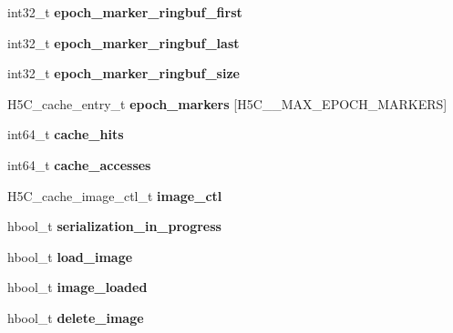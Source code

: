 \begin{DoxyCompactItemize}
int32\+\_\+t {\bfseries epoch\+\_\+marker\+\_\+ringbuf\+\_\+first}
\item 
\mbox{\label{struct_h5_c__t_a704fcc1320e81483343bdeb1ea229a11}} 
int32\+\_\+t {\bfseries epoch\+\_\+marker\+\_\+ringbuf\+\_\+last}
\item 
\mbox{\label{struct_h5_c__t_a3d063fb6a20776a9b2b7812e78e215b8}} 
int32\+\_\+t {\bfseries epoch\+\_\+marker\+\_\+ringbuf\+\_\+size}
\item 
\mbox{\label{struct_h5_c__t_acecfcc8548971c4bf08555a20e411fc6}} 
H5\+C\+\_\+cache\+\_\+entry\+\_\+t {\bfseries epoch\+\_\+markers} \mbox{[}H5\+C\+\_\+\+\_\+\+M\+A\+X\+\_\+\+E\+P\+O\+C\+H\+\_\+\+M\+A\+R\+K\+E\+RS\mbox{]}
\item 
\mbox{\label{struct_h5_c__t_a7377b81b9f84cbbb0692db1addefa52b}} 
int64\+\_\+t {\bfseries cache\+\_\+hits}
\item 
\mbox{\label{struct_h5_c__t_a96c34125092dfb54530c86b448d1de1a}} 
int64\+\_\+t {\bfseries cache\+\_\+accesses}
\item 
\mbox{\label{struct_h5_c__t_a2cac44c9db80702d5f7ded4c929fb769}} 
H5\+C\+\_\+cache\+\_\+image\+\_\+ctl\+\_\+t {\bfseries image\+\_\+ctl}
\item 
\mbox{\label{struct_h5_c__t_acc676110b238bc3ab1377fc3ec0b693d}} 
hbool\+\_\+t {\bfseries serialization\+\_\+in\+\_\+progress}
\item 
\mbox{\label{struct_h5_c__t_ade4daf9baf4ee45b613678834e4cb99d}} 
hbool\+\_\+t {\bfseries load\+\_\+image}
\item 
\mbox{\label{struct_h5_c__t_af7aae9a018dd3aad3a031254ea295be0}} 
hbool\+\_\+t {\bfseries image\+\_\+loaded}
\item 
\mbox{\label{struct_h5_c__t_a8f528e23e8ee25e2252ba31ecc205e15}} 
hbool\+\_\+t {\bfseries delete\+\_\+image}
\item 
\mbox{\label{struct_h5_c__t_acc8f6c4cd52f210431dae43f22d14cc5}} 

\end{DoxyCompactItemize}
